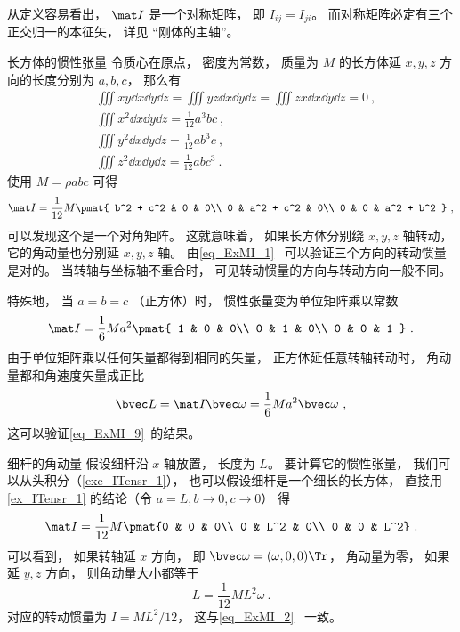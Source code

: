 从定义容易看出， $\mat I$ 是一个对称矩阵， 即 $I_{ij} = I_{ji}$。 而对称矩阵必定有三个正交归一的本征矢， 详见 “刚体的主轴”。

\begin{example}{长方体的惯性张量}\label{ex_ITensr_1}
令质心在原点， 密度为常数， 质量为 $M$ 的长方体延 $x, y, z$ 方向的长度分别为 $a, b, c$， 那么有
\begin{equation}
\begin{aligned}
&\iiint xy \dd{x}\dd{y}\dd{z} = \iiint yz \dd{x}\dd{y}\dd{z} = \iiint zx \dd{x}\dd{y}\dd{z} = 0~,\\
&\iiint x^2 \dd{x}\dd{y}\dd{z} = \frac{1}{12} a^3 bc~,\\
&\iiint y^2 \dd{x}\dd{y}\dd{z} = \frac{1}{12} ab^3 c~,\\
&\iiint z^2 \dd{x}\dd{y}\dd{z} = \frac{1}{12} ab c^3~.
\end{aligned}
\end{equation}
使用 $M = \rho abc$ 可得
\begin{equation}\label{eq_ITensr_4}
\mat I = \frac{1}{12} M
\pmat{
   b^2 + c^2 & 0 & 0\\
   0 & a^2 + c^2 & 0\\
   0 & 0 & a^2 + b^2
}~,
\end{equation}
可以发现这个是一个对角矩阵。 这就意味着， 如果长方体分别绕 $x, y, z$ 轴转动， 它的角动量也分别延 $x, y, z$ 轴。 由\autoref{eq_ExMI_1}~ 可以验证三个方向的转动惯量是对的。 当转轴与坐标轴不重合时， 可见转动惯量的方向与转动方向一般不同。

特殊地， 当 $a = b = c$ （正方体）时， 惯性张量变为单位矩阵乘以常数
\begin{equation}
\mat I = \frac{1}{6} Ma^2
\pmat{
   1 & 0 & 0\\
   0 & 1 & 0\\
   0 & 0 & 1
}~.
\end{equation}
由于单位矩阵乘以任何矢量都得到相同的矢量， 正方体延任意转轴转动时， 角动量都和角速度矢量成正比
\begin{equation}
\bvec L = \mat I \bvec \omega = \frac{1}{6} Ma^2 \bvec \omega~,
\end{equation}
这可以验证\autoref{eq_ExMI_9}~的结果。
\end{example}

\begin{example}{细杆的角动量}
假设细杆沿 $x$ 轴放置， 长度为 $L$。 要计算它的惯性张量， 我们可以从头积分（\autoref{exe_ITensr_1}）， 也可以假设细杆是一个细长的长方体， 直接用\autoref{ex_ITensr_1} 的结论（令 $a = L, b \to 0, c \to 0$） 得
\begin{equation}\label{eq_ITensr_5}
\mat I = \frac{1}{12} M \pmat{0 & 0 & 0\\ 0 & L^2 & 0\\ 0 & 0 & L^2}~.
\end{equation}
可以看到， 如果转轴延 $x$ 方向， 即 $\bvec\omega = (\omega, 0, 0)\Tr$， 角动量为零， 如果延 $y, z$ 方向， 则角动量大小都等于
\begin{equation}
L = \frac{1}{12} M L^2 \omega~.
\end{equation}
对应的转动惯量为 $I = ML^2/12$， 这与\autoref{eq_ExMI_2}~ 一致。
\end{example}

